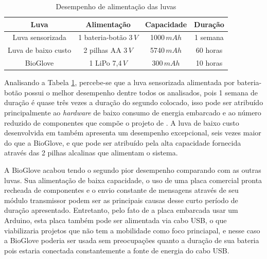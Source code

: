 \documentclass[
	12pt,				%
	openright,			%
	oneside,			%
	a4paper,			%
	english,			%
	brazil				%
	]{abntex2}
\begin{document}
		\begin{table}[H]
  	\centering
		\caption{Desempenho de alimentação das luvas}
    \begin{tabular}{c|c|c|c}
      \midrule
			Luva 								& Alimentação							&	Capacidade	& Duração	\\
      \midrule                                            					
			Luva sensorizada 		& 1 bateria-botão	3$\,V$	& 1000$\,mAh$		& 1 semana\\
			Luva de baixo custo & 2 pilhas AA 3$\,V$			& 5740$\,mAh$		& 60 horas\\
			BioGlove						& 1 LiPo 7,4$\,V$					& 300$\,mAh$			&	10 horas\\	
      \midrule
    \end{tabular}
		\label{Tab:battery-range}
		\end{table}

		Analisando a Tabela \ref{Tab:battery-range}, percebe-se que a luva sensorizada alimentada por bateria-botão possui o melhor desempenho dentre todos os analisados, pois 1 semana de duração é quase três vezes a duração do segundo colocado, isso pode ser atribuído principalmente ao \textit{hardware} de baixo consumo de energia embarcado e ao número reduzido de componentes que compõe o projeto de \cite{michela2013rehab}. A luva de baixo custo desenvolvida em \cite{simone2007lowcost} também apresenta um desempenho excepcional, seis vezes maior do que a BioGlove, e que pode ser atribuído pela alta capacidade fornecida através das 2 pilhas alcalinas que alimentam o sistema.


		A BioGlove acabou tendo o segundo pior desempenho comparando com as outras luvas. Sua alimentação de baixa capacidade, o uso de uma placa comercial pronta recheada de componentes e o envio constante de mensagens através de seu módulo transmissor podem ser as principais causas desse curto período de duração apresentado. Entretanto, pelo fato de a placa embarcada usar um Arduino, esta placa também pode ser alimentada via cabo USB, o que viabilizaria projetos que não tem a mobilidade como foco princiapal, e nesse caso a BioGlove poderia ser usada sem preocupações quanto a duração de sua bateria pois estaria conectada constantemente a fonte de energia do cabo USB.
\end{document}
